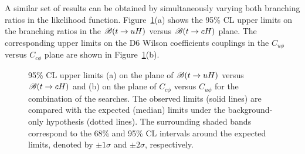 A similar set of results can be obtained by simultaneously varying both branching ratios in the likelihood function.
Figure~\ref{fig:limits_combo_2D}(a) shows the 95\% CL upper limits on the branching ratios in the $\mathscr{B}(t\to uH)$ versus $\mathscr{B}(t\to cH)$ plane. 
The corresponding upper limits on the D6 Wilson coefficients couplings in the $C_{u\phi}$ versus $C_{c\phi}$ plane are shown in Figure~\ref{fig:limits_combo_2D}(b).

\begin{figure}[t!]
\begin{center}
\caption{\small {95\% CL upper limits (a) on the plane of $\mathscr{B}(t\to uH)$ versus $\mathscr{B}(t\to cH)$ and (b) on the plane 
of $C_{c\phi}$ versus $C_{u\phi}$ for the combination of the searches. The observed limits (solid lines) are compared with the expected (median) limits under the background-only hypothesis (dotted lines). The surrounding shaded bands correspond to the 68\% and 95\% CL intervals around the expected limits, 
denoted by $\pm 1\sigma$ and $\pm 2\sigma$, respectively.}}
\label{fig:limits_combo_2D} 
\end{center}
\end{figure}



